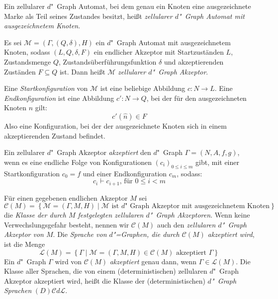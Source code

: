 \documentclass[11pt]{article}
\newcommand{\defWord}[1]{\emph{#1}}
\begin{document}
\begin{definition}[Akzeptanz]
	Ein zellularer $d$"~Graph Automat, bei dem genau ein Knoten eine ausgezeichnete Marke als Teil seines Zustandes  besitzt, heißt \defWord{zellularer $d$"~Graph Automat mit ausgezeichnetem Knoten}.
	
	Es sei $\mathcal{M} = \left(\Gamma, (Q, \delta), H \right)$ ein $d$"~Graph Automat mit ausgezeichnetem Knoten, sodass $(L, Q, \delta, F)$ ein endlicher Akzeptor mit Startzuständen $L$, Zustandsmenge $Q$, Zustandsüberführungsfunktion $\delta$ und akzeptierenden Zuständen $F \subseteq Q$ ist. Dann heißt $\mathcal{M}$ \defWord{zellularer $d$"~Graph Akzeptor}.
	
	Eine \defWord{Startkonfiguration} von $\mathcal{M}$ ist eine beliebige Abbildung $c : N \rightarrow L$. 
	Eine \defWord{Endkonfiguration} ist eine Abbildung $c' : N \rightarrow Q$, bei der für den ausgezeichneten Knoten $\hat{n}$ gilt: 
	\begin{displaymath}
		c'(\hat{n}) \in F
	\end{displaymath} 
	Also eine Konfiguration, bei der der ausgezeichnete Knoten sich in einem akzeptierenden Zustand befindet.
	
	Ein zellularer $d$"~Graph Akzeptor \defWord{akzeptiert} den $d$"~Graph $\Gamma = (N, A, f, g)$, wenn es eine endliche Folge von Konfigurationen $\left(c_i\right)_{0 \le i \le m}$ gibt, mit einer Startkonfiguration $c_0 = f$ und einer Endkonfiguration $c_m$, sodass:
	\begin{displaymath}
		c_{i} \vdash c_{i+1} \text{, für } 0 \le i < m
	\end{displaymath}
\end{definition}

\begin{definition}[Sprachen]
	Für einen gegebenen endlichen Akzeptor $M$ sei 
	\begin{displaymath}
		\mathcal{C}(M) = \left\{\mathcal{M} = \left(\Gamma, M, H\right) \mid \mathcal{M} \text{ ist $d$"~Graph Akzeptor mit ausgezeichnetem Knoten} \right\}
	\end{displaymath} 
	die \defWord{Klasse der durch $M$ festgelegten zellularen $d$"~Graph Akzeptoren}. 
	Wenn keine Verwechslungsgefahr besteht, nennen wir $\mathcal{C}(M)$ auch den \defWord{zellularen $d$"~Graph Akzeptor von $M$}.
	Die \defWord{Sprache von $d$"=Graphen, die durch $\mathcal{C}(M)$ akzeptiert wird}, ist die Menge 
	\begin{displaymath}
		\mathcal{L}(M) = \left\{\Gamma \mid \mathcal{M} = \left(\Gamma, M, H\right) \in \mathcal{C}(M) \text{ akzeptiert } \Gamma \right\}
	\end{displaymath}
	Ein $d$"~Graph $\Gamma$ wird von $\mathcal{C}(M)$ \defWord{akzeptiert} genau dann, wenn $\Gamma \in \mathcal{L}(M)$.
	Die Klasse aller Sprachen, die von einem (deterministischen) zellularen $d$"~Graph Akzeptor akzeptiert wird, heißt die Klasse der (deterministischen) \defWord{$d$"~Graph Sprachen} $(D)\mathcal{C}d\mathcal{L}$. 
\end{definition}
\end{document}
